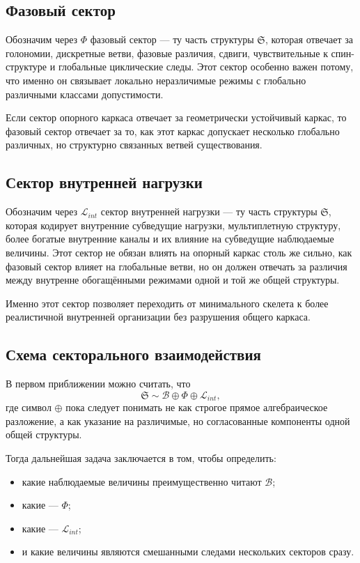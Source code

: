 \documentclass[12pt,a4paper]{article}
\begin{document}
\subsection{Фазовый сектор}

Обозначим через \(\Phi\) фазовый сектор --- ту часть структуры \(\mathfrak{S}\), которая отвечает за голономии, дискретные ветви, фазовые различия, сдвиги, чувствительные к спин-структуре и глобальные циклические следы. Этот сектор особенно важен потому, что именно он связывает локально неразличимые режимы с глобально различными классами допустимости.

Если сектор опорного каркаса отвечает за геометрически устойчивый каркас, то фазовый сектор отвечает за то, как этот каркас допускает несколько глобально различных, но структурно связанных ветвей существования.

\subsection{Сектор внутренней нагрузки}

Обозначим через \(\mathcal{L}_{int}\) сектор внутренней нагрузки --- ту часть структуры \(\mathfrak{S}\), которая кодирует внутренние субведущие нагрузки, мультиплетную структуру, более богатые внутренние каналы и их влияние на субведущие наблюдаемые величины. Этот сектор не обязан влиять на опорный каркас столь же сильно, как фазовый сектор влияет на глобальные ветви, но он должен отвечать за различия между внутренне обогащёнными режимами одной и той же общей структуры.

Именно этот сектор позволяет переходить от минимального скелета к более реалистичной внутренней организации без разрушения общего каркаса.

\subsection{Схема секторального взаимодействия}

В первом приближении можно считать, что
\begin{equation}
\mathfrak{S} \sim \mathcal{B} \oplus \Phi \oplus \mathcal{L}_{int},
\end{equation}
где символ \(\oplus\) пока следует понимать не как строгое прямое алгебраическое разложение, а как указание на различимые, но согласованные компоненты одной общей структуры.

Тогда дальнейшая задача заключается в том, чтобы определить:
\begin{itemize}
    \item какие наблюдаемые величины преимущественно читают \(\mathcal{B}\);
    \item какие --- \(\Phi\);
    \item какие --- \(\mathcal{L}_{int}\);
    \item и какие величины являются смешанными следами нескольких секторов сразу.
\end{itemize}
\end{document}
